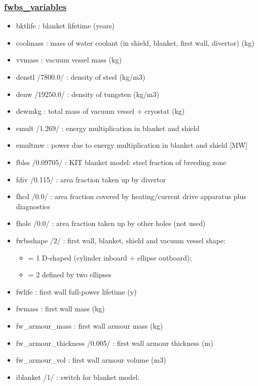 \documentclass[]{article}
\providecommand{\tightlist}{%
  \setlength{\itemsep}{0pt}\setlength{\parskip}{0pt}}
\begin{document}
\begin{itemize}
  \subsubsection{\texorpdfstring{\href{fwbs_variables.html}{fwbs\_variables}}{fwbs\_variables}}\label{fwbs_variables}

  \begin{itemize}
  \item
    bktlife : blanket lifetime (years)
  \item
    coolmass : mass of water coolant (in shield, blanket, first wall,
    divertor) (kg)
  \item
    vvmass : vacuum vessel mass (kg)
  \item
    denstl /7800.0/ : density of steel (kg/m3)
  \item
    denw /19250.0/ : density of tungsten (kg/m3)
  \item
    dewmkg : total mass of vacuum vessel + cryostat (kg)
  \item
    emult /1.269/ : energy multiplication in blanket and shield
  \item
    emultmw : power due to energy multiplication in blanket and shield
    {[}MW{]}
  \item
    fblss /0.09705/ : KIT blanket model: steel fraction of breeding zone
  \item
    fdiv /0.115/ : area fraction taken up by divertor
  \item
    fhcd /0.0/ : area fraction covered by heating/current drive
    apparatus plus diagnostics
  \item
    fhole /0.0/ : area fraction taken up by other holes (not used)
  \item
    fwbsshape /2/ : first wall, blanket, shield and vacuum vessel shape:

    \begin{itemize}
    \tightlist
    \item
      = 1 D-shaped (cylinder inboard + ellipse outboard);
    \item
      = 2 defined by two ellipses
    \end{itemize}
  \item
    fwlife : first wall full-power lifetime (y)
  \item
    fwmass : first wall mass (kg)
  \item
    fw\_armour\_mass : first wall armour mass (kg)
  \item
    fw\_armour\_thickness /0.005/ : first wall armour thickness (m)
  \item
    fw\_armour\_vol : first wall armour volume (m3)
  \item
    iblanket /1/ : switch for blanket model:


\end{itemize}
\end{itemize}
\end{document}

